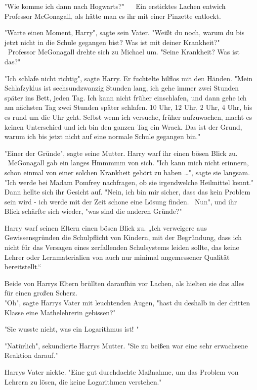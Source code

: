{"Wie komme ich dann nach Hogwarts?" ~ ~Ein ersticktes Lachen entwich Professor McGonagall, als hätte man es ihr mit einer Pinzette entlockt. ~ ~

"Warte einen Moment, Harry", sagte sein Vater. "Weißt du noch, warum du bis jetzt nicht in die Schule gegangen bist? Was ist mit deiner Krankheit?" ~ ~Professor McGonagall drehte sich zu Michael um. "Seine Krankheit? Was ist das?" ~ ~

"Ich schlafe nicht richtig", sagte Harry. Er fuchtelte hilflos mit den Händen. "Mein Schlafzyklus ist sechsundzwanzig Stunden lang, ich gehe immer zwei Stunden später ins Bett, jeden Tag. Ich kann nicht früher einschlafen, und dann gehe ich am nächsten Tag zwei Stunden später schlafen. 10 Uhr, 12 Uhr, 2 Uhr, 4 Uhr, bis es rund um die Uhr geht. Selbst wenn ich versuche, früher aufzuwachen, macht es keinen Unterschied und ich bin den ganzen Tag ein Wrack. Das ist der Grund, warum ich bis jetzt nicht auf eine normale Schule gegangen bin." ~ ~

"Einer der Gründe", sagte seine Mutter. Harry warf ihr einen bösen Blick zu. ~ ~McGonagall gab ein langes Hmmmmm von sich. "Ich kann mich nicht erinnern, schon einmal von einer solchen Krankheit gehört zu haben …", sagte sie langsam. "Ich werde bei Madam Pomfrey nachfragen, ob sie irgendwelche Heilmittel kennt." Dann hellte sich ihr Gesicht auf. "Nein, ich bin mir sicher, dass das kein Problem sein wird - ich werde mit der Zeit schone eine Lösung finden. ~Nun", und ihr Blick schärfte sich wieder, "was sind die anderen Gründe?" ~ ~

Harry warf seinen Eltern einen bösen Blick zu. „Ich verweigere aus Gewissensgründen die Schulpflicht von Kindern, mit der Begründung, dass ich nicht für das Versagen eines zerfallenden Schulsystems leiden sollte, das keine Lehrer oder Lernmaterialien von auch nur minimal angemessener Qualität bereitstellt.“ ~ ~

Beide von Harrys Eltern brüllten daraufhin vor Lachen, als hielten sie das alles für einen großen Scherz.\\ "Oh", sagte Harrys Vater mit leuchtenden Augen, "hast du deshalb in der dritten Klasse eine Mathelehrerin gebissen?" ~ ~

"Sie wusste nicht, was ein Logarithmus ist! "

"Natürlich", sekundierte Harrys Mutter. "Sie zu beißen war eine sehr erwachsene Reaktion darauf." ~ ~

Harrys Vater nickte. "Eine gut durchdachte Maßnahme, um das Problem von Lehrern zu lösen, die keine Logarithmen verstehen." ~ ~

}
